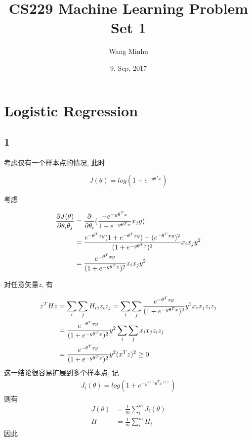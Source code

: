 \documentclass{ctexart}
\begin{document}
		\title{CS229 Machine Learning Problem Set 1}
		\author{Wang Minhu}
		\date{9, Sep, 2017}
		\maketitle
		\clearpage
	\section{Logistic Regression}
	\subsection{1}
	
	考虑仅有一个样本点的情况, 此时
	
	\begin{equation}
		J(\theta) = log(1 + e^{-y\theta^Tx})
	\end{equation}
	
	考虑
	
	\begin{align}
		\frac{\partial J(\theta)}{\partial \theta_i \theta_j} &= \frac{\partial}{\partial \theta_i}(\frac{-e^{-y\theta^Tx}}{1 + e^{-y\theta^Tx}} x_j y) \notag \\
		&= \frac{e^{-\theta^Txy}(1 + e^{-\theta^Txy}) - (e^{-\theta^Txy})^2}{(1 + e^{-y\theta^Tx})^2}x_i x_j y^2 \notag \\
		&= \frac{e^{-\theta^Txy}}{(1 + e^{-y\theta^Tx})^2}x_i x_j y^2
	\end{align}
	
	对任意矢量$z$, 有
	
	\begin{align}
		z^THz &= \sum_i \sum_j H_{ij} z_i z_j = \sum_i \sum_j \frac{e^{-\theta^Txy}}{(1 + e^{-y\theta^Tx})^2} y^2 x_i x_j z_i z_j \notag \\
		&= \frac{e^{-\theta^Txy}}{(1 + e^{-y\theta^Tx})^2} y^2 \sum_i \sum_j  x_i x_j z_i z_j \notag \\
		&= \frac{e^{-\theta^Txy}}{(1 + e^{-y\theta^Tx})^2} y^2 (x^Tz)^2 \ge 0
	\end{align}
	这一结论很容易扩展到多个样本点, 记
	\begin{align}
		J_i(\theta) = log(1 + e^{-y^{(i)}\theta^Tx^{(i)}})
	\end{align}
	则有
	\begin{align}
		J(\theta) &= \frac{1}{m}\sum_i^m J_i(\theta) \\
		H &= \frac{1}{m} \sum_i^m H_i
	\end{align}
	因此
	
\end{document}
